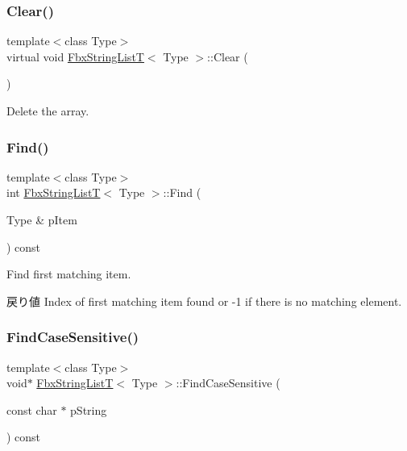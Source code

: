 \subsubsection{\texorpdfstring{Clear()}{Clear()}}
{\footnotesize\ttfamily template$<$class Type$>$ \\
virtual void \hyperlink{class_fbx_string_list_t}{Fbx\+String\+ListT}$<$ Type $>$\+::Clear (\begin{DoxyParamCaption}{ }\end{DoxyParamCaption})\hspace{0.3cm}{\ttfamily [virtual]}}



Delete the array. 

\mbox{\label{class_fbx_string_list_t_a537eb6d3e7568488280c9cf6fd37899f}} 
\subsubsection{\texorpdfstring{Find()}{Find()}}
{\footnotesize\ttfamily template$<$class Type$>$ \\
int \hyperlink{class_fbx_string_list_t}{Fbx\+String\+ListT}$<$ Type $>$\+::Find (\begin{DoxyParamCaption}\item[{Type \&}]{p\+Item }\end{DoxyParamCaption}) const}

Find first matching item. \begin{DoxyReturn}{戻り値}
Index of first matching item found or -\/1 if there is no matching element. 
\end{DoxyReturn}
\mbox{\label{class_fbx_string_list_t_a3b5a6fa9a9e231c99f15b6493627663c}} 
\subsubsection{\texorpdfstring{Find\+Case\+Sensitive()}{FindCaseSensitive()}}
{\footnotesize\ttfamily template$<$class Type$>$ \\
void$\ast$ \hyperlink{class_fbx_string_list_t}{Fbx\+String\+ListT}$<$ Type $>$\+::Find\+Case\+Sensitive (\begin{DoxyParamCaption}\item[{const char $\ast$}]{p\+String }\end{DoxyParamCaption}) const}

